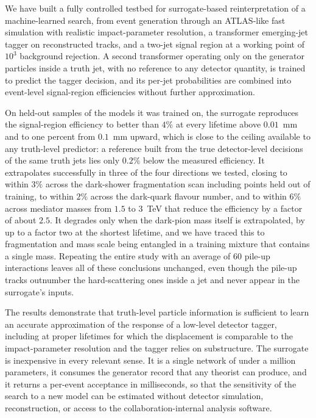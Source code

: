 \documentclass[a4paper,11pt]{article}
\begin{document}
We have built a fully controlled testbed for surrogate-based
reinterpretation of a machine-learned search, from event generation
through an ATLAS-like fast simulation with realistic impact-parameter
resolution, a transformer emerging-jet tagger on reconstructed tracks,
and a two-jet signal region at a working point of $10^{3}$ background
rejection. A second transformer operating only on the generator
particles inside a truth jet, with no reference to any detector
quantity, is trained to predict the tagger decision, and its per-jet
probabilities are combined into event-level signal-region efficiencies
without further approximation.

On held-out samples of the models it was trained on, the surrogate
reproduces the signal-region efficiency to better than $4\%$ at every
lifetime above $0.01$~mm and to one percent from $0.1$~mm upward,
which is close to the ceiling available to any truth-level predictor:
a reference built from the true detector-level decisions of the same
truth jets lies only $0.2\%$ below the measured efficiency. It
extrapolates successfully in three of the four directions we tested,
closing to within $3\%$ across the dark-shower fragmentation scan
including points held out of training, to within $2\%$ across the
dark-quark flavour number, and to within $6\%$ across mediator masses
from $1.5$ to $3$~TeV that reduce the efficiency by a factor of about
$2.5$. It degrades only when the dark-pion mass itself is extrapolated,
by up to a factor two at the shortest lifetime, and we have traced this
to fragmentation and mass scale being entangled in a training mixture
that contains a single mass. Repeating the entire study with an average
of $60$ pile-up interactions leaves all of these conclusions unchanged,
even though the pile-up tracks outnumber the hard-scattering ones
inside a jet and never appear in the surrogate's inputs.

The results demonstrate that truth-level particle information is
sufficient to learn an accurate approximation of the response of a
low-level detector tagger, including at proper lifetimes for which the
displacement is comparable to the impact-parameter resolution and the
tagger relies on substructure. The surrogate is inexpensive in every
relevant sense. It is a single network of under a million parameters,
it consumes the generator record that any theorist can produce, and
it returns a per-event acceptance in milliseconds, so that the
sensitivity of the search to a new model can be estimated without
detector simulation, reconstruction, or access to the
collaboration-internal analysis software.
\end{document}
